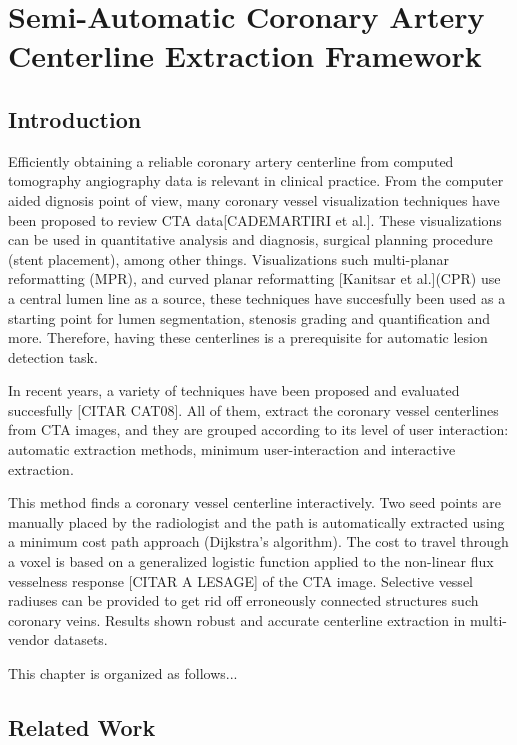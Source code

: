 \chapter{Semi-Automatic Coronary Artery Centerline Extraction Framework}
%

\section{Introduction}
%


Efficiently obtaining a reliable coronary artery centerline from computed tomography angiography data is relevant in clinical practice. From the computer aided dignosis point of view, many coronary vessel visualization techniques have been proposed to review CTA data[CADEMARTIRI et al.].  These visualizations can be used in quantitative analysis and diagnosis, surgical planning procedure (stent placement), among other things. Visualizations such multi-planar reformatting (MPR), and curved planar reformatting [Kanitsar et al.](CPR) use a central lumen line as a source, these techniques have succesfully been used as a starting point for lumen segmentation, stenosis grading and quantification and more. Therefore, having these centerlines is a prerequisite for automatic lesion detection task.

In recent years, a variety of techniques have been proposed and evaluated succesfully [CITAR CAT08]. All of them, extract the coronary vessel centerlines from CTA images, and they are grouped according to its level of user interaction: automatic extraction methods, minimum user-interaction and interactive extraction.

This method finds a coronary vessel centerline interactively. Two seed points are manually placed by the radiologist and the path is automatically extracted using a minimum cost path approach (Dijkstra’s algorithm). The cost to travel through a voxel is based on a generalized logistic function applied to the non-linear flux vesselness response [CITAR A LESAGE] of the CTA image. Selective vessel radiuses can be provided to get rid off erroneously connected structures such coronary veins. Results shown robust and accurate centerline extraction in multi-vendor datasets.

This chapter is organized as follows... 


\section{Related Work}

